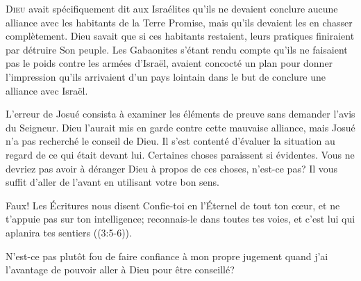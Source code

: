 
\lettrine{D}{ieu} avait spécifiquement dit aux Israélites
 qu'ils ne devaient conclure aucune alliance avec les habitants
 de la Terre Promise, mais qu'ils devaient les en chasser complètement.
 Dieu savait que si ces habitants restaient, leurs pratiques finiraient
 par détruire Son peuple.
 Les Gabaonites s'étant rendu compte qu'ils ne faisaient
 pas le poids contre les armées d'Israël,
 avaient concocté un plan pour donner l'impression
 qu'ils arrivaient d'un pays lointain
 dans le but de conclure une alliance avec Israël.

L'erreur de Josué consista à examiner les éléments de preuve
 sans demander l'avis du Seigneur.
 Dieu l'aurait mis en garde contre cette mauvaise alliance,
 mais Josué n'a pas recherché le conseil de Dieu.
 Il s'est contenté d'évaluer la situation au regard de ce qui était devant lui.
 Certaines choses paraissent si évidentes.
 Vous ne devriez pas avoir à déranger Dieu à propos de ces choses,
 n'est-ce pas? 
 Il vous suffit d'aller de l'avant en utilisant votre bon sens.

Faux! Les Écritures nous disent\frcolon{}
 \Og Confie-toi en l'Éternel de tout ton c\oe{}ur,
 et ne t'appuie pas sur ton intelligence;
 reconnais-le dans toutes tes voies,
 et c'est lui qui aplanira tes sentiers \Fg{} ((3:5-6)).


N'est-ce pas plutôt fou de faire confiance à mon propre jugement
 quand j'ai l'avantage de pouvoir aller à Dieu pour être conseillé? 

\dvrule



